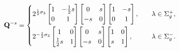 \begin{equation}
\mathbf{Q}^{-s} = 
\begin{cases}
2^{\frac{1}{2}\sigma_3} \begin{bmatrix} 1 & -\frac{1}{2}s \\ 0 & 1 \end{bmatrix} \begin{bmatrix} 0 & s \\ -s & 0 \end{bmatrix} \begin{bmatrix} 1 & -s \\ 0 & 1 \end{bmatrix}, \quad& \lambda\in \Sigma_g^+,\vspace{0.33em}\\
 2^{-\frac{1}{2}\sigma_3} \begin{bmatrix} 1 & 0 \\ \frac{1}{2}s & 1 \end{bmatrix} \begin{bmatrix} 0 & s \\ -s & 0 \end{bmatrix} \begin{bmatrix} 1 & 0 \\ s & 1 \end{bmatrix},\quad& \lambda\in \Sigma_g^-.
\end{cases}
\label{eq:Q-triple-factorization}
\end{equation}
